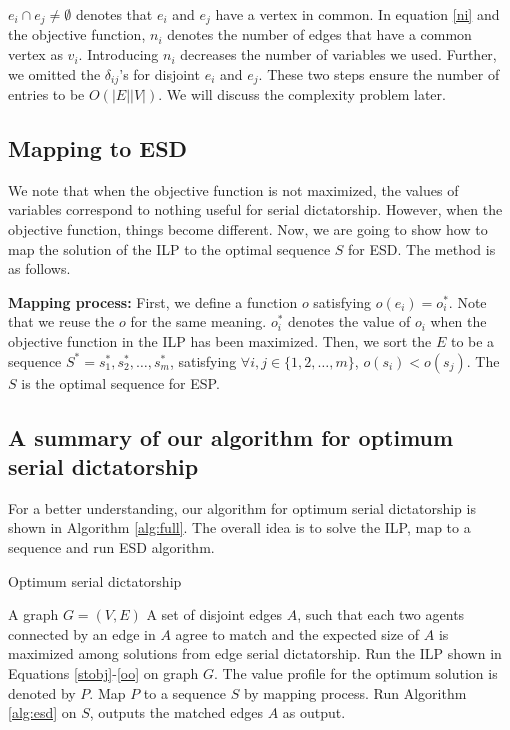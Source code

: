 \documentclass[letterpaper]{article}
\begin{document}
 $e_i\cap e_j\neq \emptyset$ denotes that $e_i$ and $e_j$ have a vertex in common. 
In equation \ref{ni} and the objective function, $n_i$ denotes the number of edges that have a common vertex as $v_i$.
Introducing $n_i$ decreases the number of variables we used.
Further, we omitted the $\delta_{ij}$'s for disjoint $e_i$ and $e_j$.
These two steps ensure the number of entries to be $O(|E||V|)$.
We will discuss the complexity problem later.

\subsection{Mapping to ESD}
We note that when the objective function is not maximized, the values of variables correspond to nothing useful for serial dictatorship.
However, when the objective function, things become different.
Now, we are going to show how to map the solution of the ILP to the optimal sequence $S$ for ESD.
The method is as follows.

\textbf{Mapping process: }First, we define a function $o$ satisfying $o(e_i)=o_i^*$. 
Note that we reuse the $o$ for the same meaning.
$o_i^*$ denotes the value of $o_i$ when the objective function in the ILP has been maximized.
Then, we sort the $E$ to be a sequence $S^*=s_1^*,s_2^*,\ldots,s_m^*$, satisfying $\forall i,j\in\{1,2,\ldots,m\}$, $o(s_i)<o(s_j)$.
The $S$ is the optimal sequence for ESP.

\subsection{A summary of our algorithm for optimum serial dictatorship}
For a better understanding, our algorithm for optimum serial dictatorship is shown in Algorithm \ref{alg:full}.
The overall idea is to solve the ILP, map to a sequence and run ESD algorithm.
\begin{algorithm}
	\caption{Optimum serial dictatorship}
	\label{alg:full}
	\begin{algorithmic}[1]
		\Require
		A graph $G=(V,E)$
		\Ensure A set of disjoint edges $A$, such that each two agents connected by an edge in $A$ agree to match and the expected size of $A$ is maximized among solutions from edge serial dictatorship. 
		\State Run the ILP shown in Equations \ref{stobj}-\ref{oo} on graph $G$. The value profile for the optimum solution is denoted by $P$. 
		\State Map $P$ to a sequence $S$ by mapping process. 
		\State Run Algorithm \ref{alg:esd} on $S$, outputs the matched edges $A$ as output.
	\end{algorithmic}
\end{algorithm}
\end{document}
